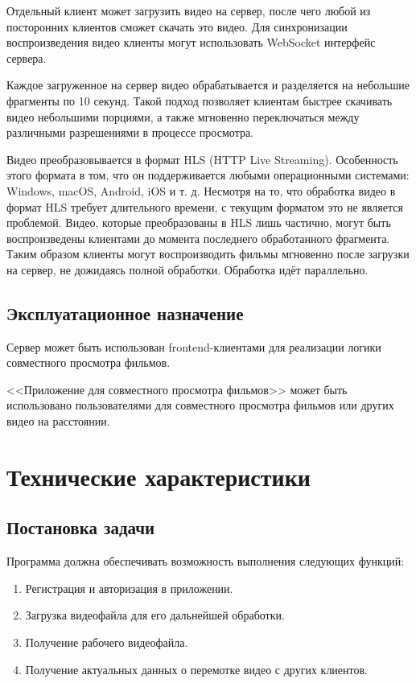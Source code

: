 \documentclass{../includes/TechDoc}
\begin{document}
    Отдельный клиент может загрузить видео на сервер, после чего любой из посторонних клиентов сможет скачать это видео.
    Для синхронизации воспроизведения видео клиенты могут использовать WebSocket интерфейс сервера.

    Каждое загруженное на сервер видео обрабатывается и разделяется на небольшие фрагменты по 10 секунд.
    Такой подход позволяет клиентам быстрее скачивать видео небольшими порциями, а также мгновенно переключаться между различными разрешениями в процессе просмотра.

    Видео преобразовывается в формат HLS (HTTP Live Streaming).
    Особенность этого формата в том, что он поддерживается любыми операционными системами: Windows, macOS, Android, iOS и т. д.
    Несмотря на то, что обработка видео в формат HLS требует длительного времени, с текущим форматом это не является проблемой.
    Видео, которые преобразованы в HLS лишь частично, могут быть воспроизведены клиентами до момента последнего обработанного фрагмента.
    Таким образом клиенты могут воспроизводить фильмы мгновенно после загрузки на сервер, не дожидаясь полной обработки.
    Обработка идёт параллельно.

    \subsection{Эксплуатационное назначение}

    Сервер может быть использован frontend-клиентами для реализации логики совместного просмотра фильмов.

    <<Приложение для совместного просмотра фильмов>> может быть использовано пользователями для совместного просмотра фильмов или других видео на расстоянии.


    \section{Технические характеристики}

    \subsection{Постановка задачи}

    Программа должна обеспечивать возможность выполнения следующих функций:\\

    \begin{enumerate}
        \item Регистрация и авторизация в приложении.
        \item Загрузка видеофайла для его дальнейшей обработки.
        \item Получение рабочего видеофайла.
        \item Получение актуальных данных о перемотке видео с других клиентов.
    \end{enumerate}
\end{document}
